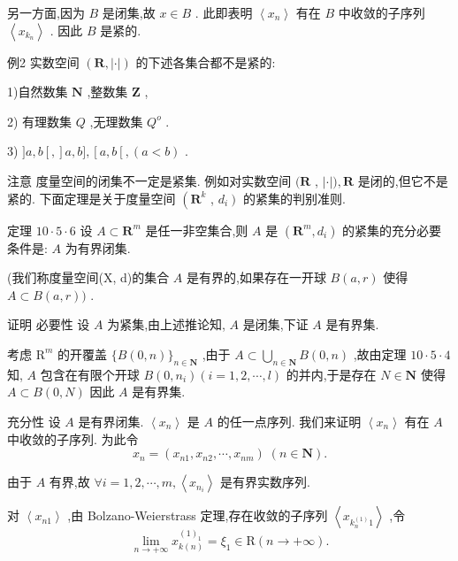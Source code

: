 另一方面,因为 $B$ 是闭集,故 $x \in  B$ . 此即表明 $\left\langle  {x}_{n}\right\rangle$ 有在 $B$ 中收敛的子序列 $\left\langle  {x}_{{k}_{n}}\right\rangle$ . 因此 $B$ 是紧的.

例2 实数空间 $\left( {\mathbf{R},\left| \cdot \right| }\right)$ 的下述各集合都不是紧的:

1)自然数集 $\mathbf{N}$ ,整数集 $\mathbf{Z}$ ,

2) 有理数集 $Q$ ,无理数集 ${Q}^{o}$ .

3) $\rbrack a,b\left\lbrack  ,\right\rbrack  a,b\rbrack ,\left\lbrack  {a,b\left\lbrack  {,\left( {a < b}\right) }\right. }\right.$ .

注意 度量空间的闭集不一定是紧集. 例如对实数空间 $(\mathbf{R}$ , $\left| \cdot \right| ),\mathbf{R}$ 是闭的,但它不是紧的. 下面定理是关于度量空间 $\left( {\mathbf{R}}^{k}\right.$ , $\left. {d}_{i}\right)$ 的紧集的判别准则.

定理 ${10} \cdot  5 \cdot  6$ 设 $A \subset  {\mathbf{R}}^{m}$ 是任一非空集合,则 $A$ 是 $\left( {{\mathbf{R}}^{m},{d}_{i}}\right)$ 的紧集的充分必要条件是: $A$ 为有界闭集.

(我们称度量空间(X, d)的集合 $A$ 是有界的,如果存在一开球 $B\left( {a,r}\right)$ 使得 $A \subset  B\left( {a,r}\right) )$ .

证明 必要性 设 $A$ 为紧集,由上述推论知, $A$ 是闭集,下证 $A$ 是有界集.

考虑 ${\mathrm{R}}^{m}$ 的开覆盖 $\{ B\left( {0,n}\right) {\} }_{n \in  \mathbf{N}}$ ,由于 $A \subset  \mathop{\bigcup }\limits_{{n \in  \mathbf{N}}}B\left( {0,n}\right)$ ,故由定理 ${10} \cdot  5 \cdot  4$ 知, $A$ 包含在有限个开球 $B\left( {0,{n}_{i}}\right) \left( {i = 1,2,\cdots ,l}\right)$ 的并内,于是存在 $N \in  \mathbf{N}$ 使得 $A \subset  B\left( {0,N}\right)$ 因此 $A$ 是有界集.

充分性 设 $A$ 是有界闭集. $\left\langle  {x}_{n}\right\rangle$ 是 $A$ 的任一点序列. 我们来证明 $\left\langle  {x}_{n}\right\rangle$ 有在 $A$ 中收敛的子序列. 为此令
$${x}_{n} = \left( {{x}_{n1},{x}_{n2},\cdots ,{x}_{nm}}\right) \;\left( {n \in  \mathbf{N}}\right) .$$

由于 $A$ 有界,故 $\forall i = 1,2,\cdots ,m,\left\langle  {x}_{{n}_{i}}\right\rangle$ 是有界实数序列.

对 $\left\langle  {x}_{n1}\right\rangle$ ,由 Bolzano-Weierstrass 定理,存在收敛的子序列 $\left\langle  {x}_{k{}_{n}^{\left( 1\right) }1}\right\rangle$ ,令
$$\mathop{\lim }\limits_{{n \rightarrow   + \infty }}{x}_{k\left( n\right) }^{{\left( 1\right) }_{1}} = {\xi }_{1} \in  \mathrm{R}\left( {n \rightarrow   + \infty }\right) .$$

